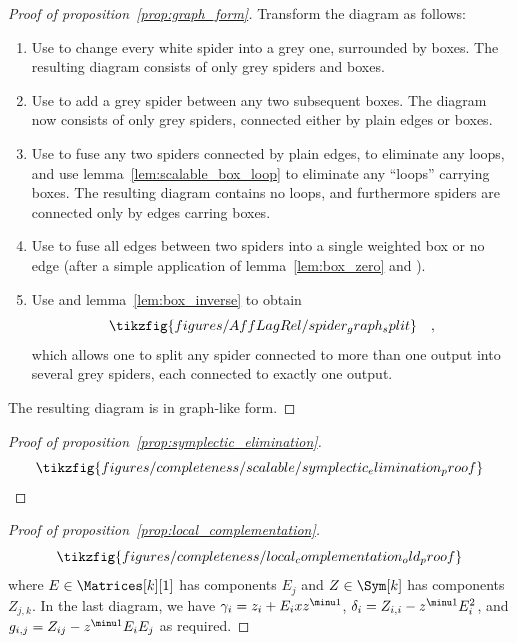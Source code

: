 \begin{proof}[Proof of proposition~\ref{prop:graph_form}]
  Transform the diagram as follows:
  \begin{enumerate}
  \item Use \TextColour to change every white spider into a grey one,
    surrounded by boxes. The resulting diagram consists of only grey
    spiders and boxes.
  \item Use \TextId to add a grey spider between any two subsequent
    boxes. The diagram now consists of only grey spiders, connected either
    by plain edges or boxes.
  \item Use \TextFusion to fuse any two spiders connected by plain edges,
    to eliminate any loops, and use lemma~\ref{lem:scalable_box_loop} to eliminate
    any ``loops'' carrying boxes. The resulting diagram contains no loops, and
    furthermore spiders are connected only by edges carring boxes.
  \item Use \TextPlus to fuse all edges between two spiders into
    a single weighted box or no edge (after a simple application of
    lemma~\ref{lem:box_zero} and \TextFusion).
  \item Use \TextId and lemma~\ref{lem:box_inverse} to obtain
    \begin{equation}
      \tikzfig{figures/AffLagRel/spider_graph_split}\quad,
    \end{equation}
    which allows one to split any spider connected to more than one output into
    several grey spiders, each connected to exactly one output.
  \end{enumerate}
  The resulting diagram is in graph-like form.
\end{proof}
\begin{proof}[Proof of proposition~\ref{prop:symplectic_elimination}]
  \begin{equation}
    \tikzfig{figures/completeness/scalable/symplectic_elimination_proof}
  \end{equation}
\end{proof}
\begin{proof}[Proof of proposition~\ref{prop:local_complementation}]
  \begin{equation}
    \tikzfig{figures/completeness/local_complementation_old_proof}
  \end{equation}
  where \(E \in \Matrices[k][1]\) has components \(E_j\) and \(Z \in \Sym[k]\)
  has components \(Z_{j,k}\). In the last diagram, we have
  \(\gamma_i = z_i + E_i x z^{\minu 1}\),
  \(\delta_i = Z_{i,i} - z^{\minu 1} E_i^2\),
  and \(g_{i,j} = Z_{i j} - z^{\minu 1} E_i E_j\) as required.
\end{proof}
